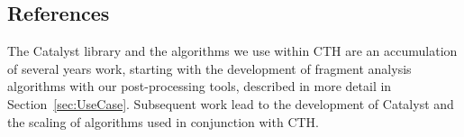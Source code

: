 \subsection{References}

The Catalyst library and the algorithms we use within CTH are an
accumulation of several years work, starting with the development of
fragment analysis algorithms with our post-processing
tools, described in more
detail in Section~\ref{sec:UseCase}.  Subsequent work lead to the
development of Catalyst and the scaling of algorithms
used in conjunction with CTH.
